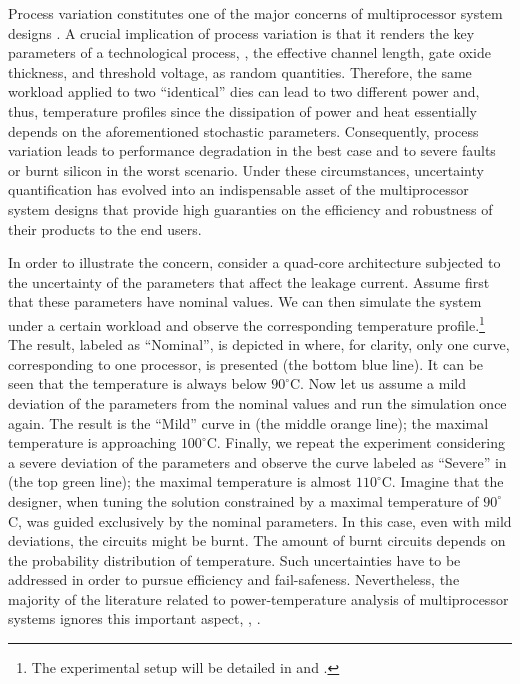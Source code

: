 Process variation constitutes one of the major concerns of multiprocessor system designs \cite{chandrakasan2001, srivastava2010}.
A crucial implication of process variation is that it renders the key parameters of a technological process, \eg, the effective channel length, gate oxide thickness, and threshold voltage, as random quantities.
Therefore, the same workload applied to two ``identical'' dies can lead to two different power and, thus, temperature profiles since the dissipation of power and heat essentially depends on the aforementioned stochastic parameters.
Consequently, process variation leads to performance degradation in the best case and to severe faults or burnt silicon in the worst scenario.
Under these circumstances, uncertainty quantification \cite{xiu2010, maitre2010} has evolved into an indispensable asset of the multiprocessor system designs that provide high guaranties on the efficiency and robustness of their products to the end users.


In order to illustrate the concern, consider a quad-core architecture subjected to the uncertainty of the parameters that affect the leakage current.
Assume first that these parameters have nominal values.
We can then simulate the system under a certain workload and observe the corresponding temperature profile.\footnote{The experimental setup will be detailed in  and .}
The result, labeled as ``Nominal'', is depicted in  where, for clarity, only one curve, corresponding to one processor, is presented (the bottom blue line). It can be seen that the temperature is always below $90^{\circ}$C.
Now let us assume a mild deviation of the parameters from the nominal values and run the simulation once again. The result is the ``Mild'' curve in  (the middle orange line); the maximal temperature is approaching $100^{\circ}$C.
Finally, we repeat the experiment considering a severe deviation of the parameters and observe the curve labeled as ``Severe'' in  (the top green line); the maximal temperature is almost $110^{\circ}$C.
Imagine that the designer, when tuning the solution constrained by a maximal temperature of $90^\circ$C, was guided exclusively by the nominal parameters.
In this case, even with mild deviations, the circuits might be burnt.
The amount of burnt circuits depends on the probability distribution of temperature.
Such uncertainties have to be addressed in order to pursue efficiency and fail-safeness.
Nevertheless, the majority of the literature related to power-temperature analysis of multiprocessor systems ignores this important aspect, \eg, \cite{rao2009, rai2011, thiele2011, ukhov2012}.

